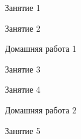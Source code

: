 %
%

\begin{class}[number=1]
	\begin{listofex}
		\item Занятие 1
	\end{listofex}
\end{class}

\begin{class}[number=2]
	\begin{listofex}
		\item Занятие 2
	\end{listofex}
\end{class}

\begin{homework}[number=1]
	\begin{listofex}
		\item Домашняя работа 1
	\end{listofex}
\end{homework}

\begin{class}[number=3]
	\begin{listofex}
		\item Занятие 3
	\end{listofex}
\end{class}

\begin{class}[number=4]
	\begin{listofex}
		\item Занятие 4
	\end{listofex}
\end{class}

\begin{homework}[number=2]
	\begin{listofex}
		\item Домашняя работа 2
	\end{listofex}
\end{homework}

\begin{class}[number=5]
	\begin{listofex}
		\item Занятие 5
	\end{listofex}
\end{class}

